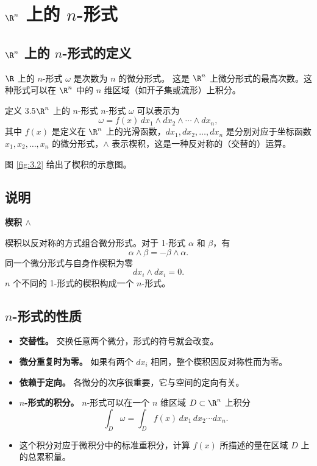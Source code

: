 \section{\texorpdfstring{$\R^n$}{Rⁿ} 上的 \texorpdfstring{$n$}{n}-形式}
\label{sec:3.3}
\subsection{\texorpdfstring{$\R^n$}{Rⁿ} 上的 \texorpdfstring{$n$}{n}-形式的定义}

$\R$ 上的 $n$-形式 $\omega$ 是次数为 $n$ 的微分形式。%
%
这是 $\R^n$ 上微分形式的最高次数。这种形式可以在 $\R^n$ 中的 $n$ 维区域（如开子集或流形）上积分。

\begin{statement}{定义 3.5}{$\R^n$ 上的 $n$-形式}
$n$-形式 $\omega$ 可以表示为
\[
  \omega=f(x)\,dx_1\wedge dx_2\wedge\cdots\wedge dx_n,
\]
其中 $f(x)$ 是定义在 $\R^n$ 上的光滑函数，$dx_1,dx_2,\dots,dx_n$ 是分别对应于坐标函数 $x_1,x_2,\dots,x_n$ 的微分形式，$\wedge$ 表示楔积，这是一种反对称的（交替的）运算。

图 \ref{fig:3.2} 给出了楔积的示意图。
\end{statement}
\begin{figure}[htbp]
\centering

\end{figure}

\subsection{说明}
\noindent\textbf{楔积 $\wedge$}\par
楔积以反对称的方式组合微分形式。对于 1-形式 $\alpha$ 和 $\beta$，有
\[
  \alpha\wedge\beta=-\beta\wedge\alpha.
\]
同一个微分形式与自身作楔积为零
\[
  dx_i\wedge dx_i=0.
\]
$n$ 个不同的 1-形式的楔积构成一个 $n$-形式。

\subsection{\texorpdfstring{$n$}{n}-形式的性质}
\begin{itemize}
\item \textbf{交替性。} 交换任意两个微分，形式的符号就会改变。
\item \textbf{微分重复时为零。} 如果有两个 $dx_i$ 相同，整个楔积因反对称性而为零。
\item \textbf{依赖于定向。} 各微分的次序很重要，它与空间的定向有关。
\item \textbf{$n$-形式的积分。} $n$-形式可以在一个 $n$ 维区域 $D\subset\R^n$ 上积分
\[
  \int_D\omega=\int_D f(x)\,dx_1\,dx_2\cdots dx_n.
\]
\item 这个积分对应于微积分中的标准重积分，计算 $f(x)$ 所描述的量在区域 $D$ 上的总累积量。
\end{itemize}


